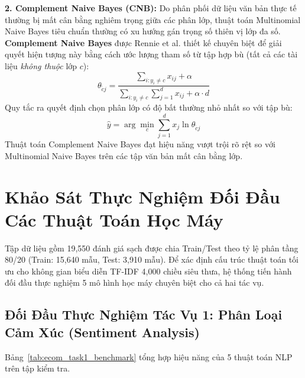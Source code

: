 \documentclass[12pt,a4paper]{report}
\begin{document}
\textbf{2. Complement Naive Bayes (CNB):}
Do phân phối dữ liệu văn bản thực tế thường bị mất cân bằng nghiêm trọng giữa các phân lớp, thuật toán Multinomial Naive Bayes tiêu chuẩn thường có xu hướng gán trọng số thiên vị lớp đa số. \textbf{Complement Naive Bayes} được Rennie et al. thiết kế chuyên biệt để giải quyết hiện tượng này bằng cách ước lượng tham số từ tập hợp bù (tất cả các tài liệu \textit{không thuộc} lớp $c$):
\begin{equation}
\theta_{\tilde{c}j} = \frac{\sum_{i: y_i \ne c} x_{ij} + \alpha}{\sum_{i: y_i \ne c} \sum_{j=1}^d x_{ij} + \alpha \cdot d}
\end{equation}
Quy tắc ra quyết định chọn phân lớp có độ bất thường nhỏ nhất so với tập bù:
\begin{equation}
\hat{y} = \arg\min_c \sum_{j=1}^d x_j \ln \theta_{\tilde{c}j}
\end{equation}
Thuật toán Complement Naive Bayes đạt hiệu năng vượt trội rõ rệt so với Multinomial Naive Bayes trên các tập văn bản mất cân bằng lớp.

\section{Khảo Sát Thực Nghiệm Đối Đầu Các Thuật Toán Học Máy}
Tập dữ liệu gồm 19,550 đánh giá sạch được chia Train/Test theo tỷ lệ phân tầng 80/20 (Train: 15,640 mẫu, Test: 3,910 mẫu). Để xác định cấu trúc thuật toán tối ưu cho không gian biểu diễn TF-IDF 4,000 chiều siêu thưa, hệ thống tiến hành đối đầu thực nghiệm 5 mô hình học máy chuyên biệt cho cả hai tác vụ.

\subsection{Đối Đầu Thực Nghiệm Tác Vụ 1: Phân Loại Cảm Xúc (Sentiment Analysis)}
Bảng~\ref{tab:ecom_task1_benchmark} tổng hợp hiệu năng của 5 thuật toán NLP trên tập kiểm tra.

\begin{table}[H]
\centering
\caption{Bảng so sánh hiệu năng 5 mô hình NLP cho Tác vụ 1 (Phân loại Cảm xúc / Khuyên mua)}
\label{tab:ecom_task1_benchmark}
\end{table}
\end{document}
